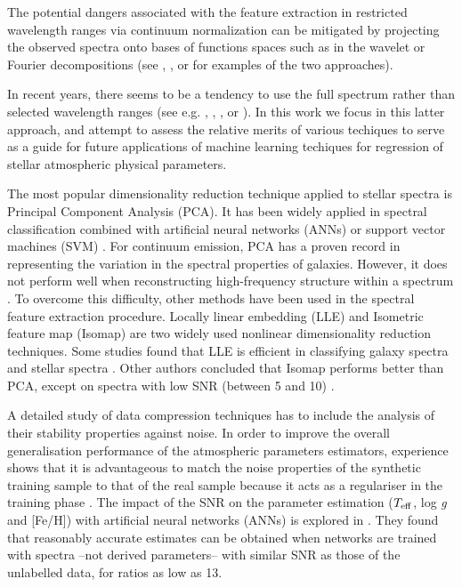 \documentclass[a4paper,fleqn,usenatbib]{mnras}
\begin{document}
The potential dangers associated with the feature extraction in
restricted wavelength ranges via continuum normalization can be
mitigated by projecting the observed spectra onto bases of functions
spaces such as in the wavelet or Fourier decompositions (see
\cite{2010PASP..122..608M}, \cite{2015MNRAS.452.1394L}, or
\cite{2015ApJS..218....3L} for examples of the two approaches).

In recent years, there seems to be a tendency to use the full spectrum
rather than selected wavelength ranges (see
e.g. \cite{2014A&A...567A...5R}, \cite{2015ApJ...808...16N},
\cite{2015MNRAS.448.2717W}, or \cite{2015arXiv151000111R}). In this
work we focus in this latter approach, and attempt to assess the
relative merits of various techiques to serve as a guide for future
applications of machine learning techiques for regression of stellar
atmospheric physical parameters.

The most popular dimensionality reduction technique applied to stellar
spectra is Principal Component Analysis (PCA). It has been widely
applied in spectral classification combined with artificial neural
networks (ANNs) \citep{singh:98} or support vector machines (SVM)
\citep{fiorentin:08b}. For continuum emission, PCA has a proven record
in representing the variation in the spectral properties of
galaxies. However, it does not perform well when reconstructing
high-frequency structure within a spectrum \citep{vanderplas:09}. To
overcome this difficulty, other methods have been used in the spectral
feature extraction procedure. Locally linear embedding (LLE)
\citep{roweisLLE:00} and Isometric feature map (Isomap)
\citep{tenenbaum:00} are two widely used nonlinear dimensionality
reduction techniques. Some studies found that LLE is efficient in
classifying galaxy spectra \citep{vanderplas:09} and stellar spectra
\citep{daniel:11}. Other authors concluded that Isomap performs better
than PCA, except on spectra with low SNR (between 5 and 10)
\citep{bu:14}.

A detailed study of data compression techniques has to include the
analysis of their stability properties against noise. In order to
improve the overall generalisation performance of the atmospheric
parameters estimators, experience shows that it is advantageous to
match the noise properties of the synthetic training sample to that of
the real sample because it acts as a regulariser in the training phase
\citep{fiorentin:08a}.  The impact of the SNR on the parameter
estimation ($T_{\rm eff}$, log \textit{g} and [Fe/H]) with artificial
neural networks (ANNs) is explored in \cite{snider:01}. They found
that reasonably accurate estimates can be obtained when networks are
trained with spectra --not derived parameters-- with similar SNR as
those of the unlabelled data, for ratios as low as 13.
\end{document}
